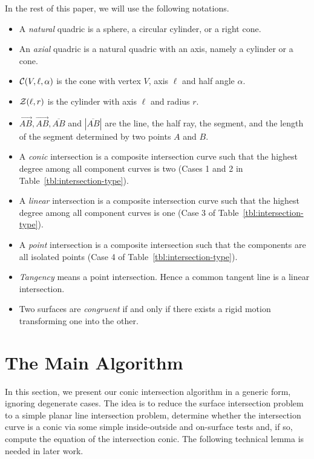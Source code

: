      In the rest of this paper, we will use the following notations.
\begin{itemize}
     \item A {\em natural} quadric is a sphere, a circular cylinder, or a 
          right cone.
     \item An {\em axial} quadric is a natural quadric with an axis, namely 
          a cylinder or a cone.
     \item ${\cal C}(V,\ell,\alpha)$ is the cone with vertex $V$, axis $\ell$
          and half angle $\alpha$.
     \item ${\cal Z}(\ell,r)$ is the cylinder with axis $\ell$ and radius $r$.
     \item $\stackrel{\longleftrightarrow}{AB},
          \stackrel{\longrightarrow}{AB},\overline{AB}$ and
          $|\overline{AB}|$ are the line, the half ray, the segment, and the 
          length of the segment determined by two points $A$ and $B$.
     \item A {\em conic} intersection is a composite intersection curve such
          that the highest degree among all component curves is two (Cases 1 
          and 2 in Table~\ref{tbl:intersection-type}).
     \item A {\em linear} intersection is a composite intersection curve such
          that the highest degree among all component curves is one (Case 3 
          of Table~\ref{tbl:intersection-type}).
     \item A {\em point} intersection is a composite intersection such that the
          components are all isolated points (Case 4 of 
          Table~\ref{tbl:intersection-type}).
     \item {\em Tangency} means a point intersection.  Hence a common tangent
          line is a linear intersection.
     \item Two surfaces are {\em congruent} if and only if there exists a 
          rigid motion transforming one into the other.
\end{itemize}



\section{The Main Algorithm}
\label{section:algorithm}
     In this section, we present our conic intersection algorithm in a
generic form, ignoring degenerate cases.  The idea is to  reduce the surface 
intersection problem to a simple planar line intersection problem, determine 
whether the intersection curve is a conic via some simple inside-outside and 
on-surface tests and, if so, compute the equation of the intersection conic.
The following technical lemma is needed in later work.


